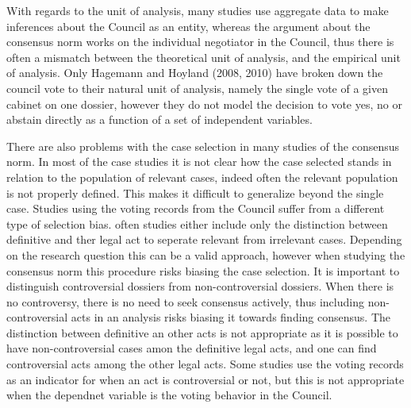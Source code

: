 With regards to the unit of analysis, many studies use aggregate data to make inferences about the Council as an entity, whereas the argument about the consensus norm works on the individual negotiator in the Council, thus there is often a mismatch between the theoretical unit of analysis, and the empirical unit of analysis. Only Hagemann and Hoyland (2008, 2010) have broken down the council vote to their natural unit of analysis, namely the single vote of a given cabinet on one dossier, however they do not model the decision to vote yes, no or abstain directly as a function of a set of independent variables.

There are also problems with the case selection in many studies of the consensus norm. In most of the case studies it is not clear how the case selected stands in relation to the population of relevant cases, indeed often the relevant population is not properly defined. This makes it difficult to generalize beyond the single case. Studies using the voting records from the Council suffer from a different type of selection bias. often studies either include only the distinction between definitive and ther legal act to seperate relevant from irrelevant cases. Depending on the research question this can be a valid approach, however when studying the consensus norm this procedure risks biasing the case selection. It is important to distinguish controversial dossiers from non-controversial dossiers. When there is no controversy, there is no need to seek consensus actively, thus including non-controversial acts in an analysis risks biasing it towards finding consensus. The distinction between definitive an other acts is not appropriate as it is possible to have non-controversial cases amon the definitive legal acts, and one can find controversial acts among the other legal acts. Some studies use the voting records as an indicator for when an act is controversial or not, but this is not appropriate when the dependnet variable is the voting behavior in the Council. 